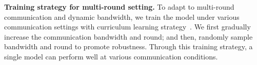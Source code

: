\textbf{Training strategy for multi-round setting.} To adapt to multi-round communication and dynamic bandwidth, we train the model under various communication settings with curriculum learning strategy~\cite{curriculum}. We first gradually increase the communication bandwidth and round; and then, randomly sample bandwidth and round to promote robustness. Through this training strategy, a single model can perform well at various communication conditions.

